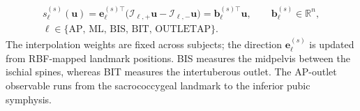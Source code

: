 \documentclass[pdflatex,sn-basic]{sn-jnl}
\begin{document}
\begin{equation}
\begin{gathered}
s_\ell^{(s)}(\mathbf u)=\mathbf e_\ell^{(s)\top}\big(\mathcal I_{\ell,+}\mathbf u-\mathcal I_{\ell,-}\mathbf u\big)=\mathbf b_\ell^{(s)\top}\mathbf u,\qquad\mathbf b_\ell^{(s)}\in\mathbb R^n,\\
\ell\in\{\text{AP, ML, BIS, BIT, OUTLETAP}\}.
\label{eq:functional-score}
\end{gathered}
\end{equation}
The interpolation weights are fixed across subjects; the direction $\mathbf e_\ell^{(s)}$ is updated from RBF-mapped landmark positions. BIS measures the midpelvis between the ischial spines, whereas BIT measures the intertuberous outlet. The AP-outlet observable runs from the sacrococcygeal landmark to the inferior pubic symphysis.
\end{document}
